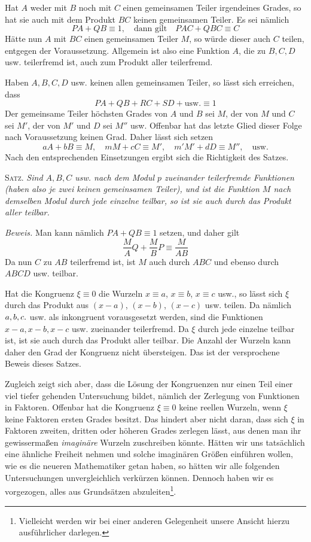 Hat $A$ weder mit $B$ noch mit $C$ einen gemeinsamen Teiler irgendeines Grades, so hat sie auch mit dem Produkt $BC$ keinen gemeinsamen Teiler. Es sei nämlich
\[
PA+QB\equiv1,\quad\text{dann gilt}\quad PAC+QBC\equiv C
\]
Hätte nun $A$ mit $BC$ einen gemeinsamen Teiler $M$, so würde dieser auch $C$ teilen, entgegen der Voraussetzung. Allgemein ist also eine Funktion $A$, die zu $B,C,D$ usw. teilerfremd ist, auch zum Produkt aller teilerfremd.

Haben $A,B,C,D$ usw. keinen allen gemeinsamen Teiler, so lässt sich erreichen, dass
\[
PA+QB+RC+SD+\text{usw.}\equiv1
\]
Der gemeinsame Teiler höchsten Grades von $A$ und $B$ sei $M$, der von $M$ und $C$ sei $M'$, der von $M'$ und $D$ sei $M''$ usw. Offenbar hat das letzte Glied dieser Folge nach Voraussetzung keinen Grad. Daher lässt sich setzen
\[
aA+bB\equiv M,\quad mM+cC\equiv M',\quad m'M'+dD\equiv M'',\quad\text{usw.}
\]
Nach den entsprechenden Einsetzungen ergibt sich die Richtigkeit des Satzes.

\textsc{Satz.} \emph{Sind $A,B,C$ usw. nach dem Modul $p$ zueinander teilerfremde Funktionen (haben also je zwei keinen gemeinsamen Teiler), und ist die Funktion $M$ nach demselben Modul durch jede einzelne teilbar, so ist sie auch durch das Produkt aller teilbar.}

\emph{Beweis.} Man kann nämlich $PA+QB\equiv1$ setzen, und daher gilt
\[
\frac MA Q+\frac MB P\equiv\frac M{AB}
\]
Da nun $C$ zu $AB$ teilerfremd ist, ist $M$ auch durch $ABC$ und ebenso durch $ABCD$ usw. teilbar.

Hat die Kongruenz $\xi\equiv0$ die Wurzeln $x\equiv a$, $x\equiv b$, $x\equiv c$ usw., so lässt sich $\xi$ durch das Produkt aus $(x-a)$, $(x-b)$, $(x-c)$ usw. teilen. Da nämlich $a,b,c\mathbin{.}$ usw. als inkongruent vorausgesetzt werden, sind die Funktionen $x-a,x-b,x-c$ usw. zueinander teilerfremd. Da $\xi$ durch jede einzelne teilbar ist, ist sie auch durch das Produkt aller teilbar. Die Anzahl der Wurzeln kann daher den Grad der Kongruenz nicht übersteigen. Das ist der versprochene Beweis dieses Satzes.

Zugleich zeigt sich aber, dass die Lösung der Kongruenzen nur einen Teil einer viel tiefer gehenden Untersuchung bildet, nämlich der Zerlegung von Funktionen in Faktoren. Offenbar hat die Kongruenz $\xi\equiv0$ keine reellen Wurzeln, wenn $\xi$ keine Faktoren ersten Grades besitzt. Das hindert aber nicht daran, dass sich $\xi$ in Faktoren zweiten, dritten oder höheren Grades zerlegen lässt, aus denen man ihr gewissermaßen \emph{imaginäre} Wurzeln zuschreiben könnte. Hätten wir uns tatsächlich eine ähnliche Freiheit nehmen und solche imaginären Größen einführen wollen, wie es die neueren Mathematiker getan haben,
so hätten wir alle folgenden Untersuchungen unvergleichlich verkürzen können. Dennoch haben wir es vorgezogen, alles aus Grundsätzen abzuleiten\begingroup\renewcommand{\thefootnote}{*)}\footnote{Vielleicht werden wir bei einer anderen Gelegenheit unsere Ansicht hierzu ausführlicher darlegen.}\endgroup.

